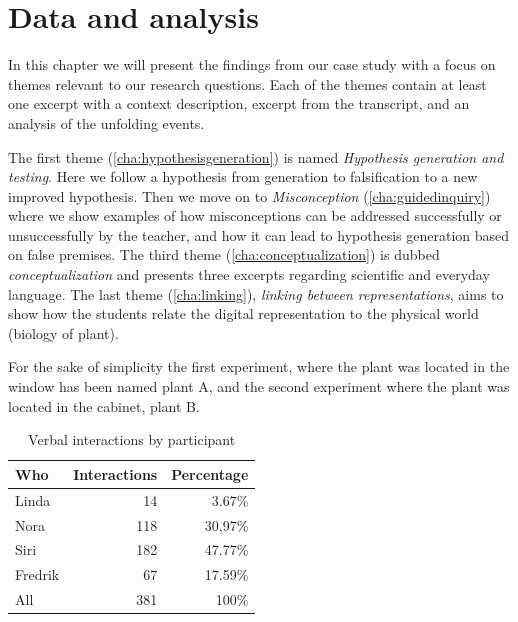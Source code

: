 \chapter{Data and analysis}
In this chapter we will present the findings from our case study with a focus on themes relevant to our research questions. Each of the themes contain at least one excerpt with a context description, excerpt from the transcript, and an analysis of the unfolding events. 

The first theme (\ref{cha:hypothesisgeneration}) is named \textit{Hypothesis generation and testing}. Here we follow a hypothesis from generation to falsification to a new improved hypothesis. Then we move on to \textit{Misconception} (\ref{cha:guidedinquiry}) where we show examples of how misconceptions can be addressed successfully or unsuccessfully by the teacher, and how it can lead to hypothesis generation based on false premises. The third theme (\ref{cha:conceptualization}) is dubbed \textit{conceptualization} and presents three excerpts regarding scientific and everyday language. The last theme (\ref{cha:linking}), \textit{linking between representations}, aims to show how the students relate the digital representation to the physical world (biology of plant).  

For the sake of simplicity the first experiment, where the plant was located in the window has been named plant A, and the second experiment where the plant was located in the cabinet, plant B. 


\begin{table}[H]
\begin{center}
	\begin{tabular}{l r r } \toprule
	Who &  Interactions  & Percentage\\ \midrule  
	Linda &	 14  & 3.67\% \\
	Nora&	118 & 30,97\% \\ 
	Siri& 	182 & 47.77\% \\
	Fredrik& 67 & 17.59\% \\ \midrule
	All &	381 & 100\%\\
	\bottomrule
	\end{tabular}
\end{center}
\caption{Verbal interactions by participant}
\end{table}

